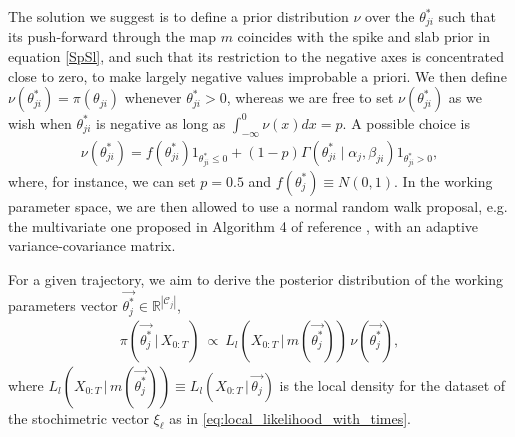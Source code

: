 \documentclass[pdflatex,sn-mathphys-num]{sn-jnl}%
\theoremstyle{thmstyleone}%
\theoremstyle{thmstyletwo}%
\theoremstyle{thmstylethree}%
\begin{document}
The solution we suggest is to define a prior distribution $\nu$ over the $
\theta_{ji}^ *$ such that its push-forward through the map $m$ coincides with the spike and slab prior in equation \eqref{SpSl}, and such that its restriction to the negative axes is concentrated close to zero, to make largely negative values improbable a priori.
We then define
$\nu(\theta_{ji}^ *)=\pi(\theta_{ji})$ whenever $\theta_{ji}^ *>0$,
whereas we are free to set $\nu(\theta_{ji}^ *)$ as we wish when $\theta_{ji}^ *$ is negative as long as $\int_{-\infty}^0 \nu (x) dx= p.$
A possible choice is
 \begin{align*}
    \nu(\theta_{ji}^*)=  f(\theta_{ji}^*)\mathrm{1}_{\theta_{ji}^*\leq 0} + (1-p) \Gamma(\theta_{ji}^* \mid \alpha_{j}, \beta_{ji})\mathrm{1}_{\theta_{ji}^*> 0} ,
\end{align*}
where, for instance, we can set $p=0.5$ and $f(\theta_{j}^*)\equiv N(0,1)$.
In the working parameter space, we are then allowed to use a normal random walk proposal, e.g. the multivariate one proposed in Algorithm 4 of reference \cite{Andrieu2008_adapt_algo}, with an adaptive variance-covariance matrix.




For a given trajectory, we aim to derive the posterior distribution of the working parameters vector 
$\overrightarrow{\theta_j^*}\in \mathbb{R}^{\left| \mathcal{C}_j \right|}$,
\begin{align*}
\pi\left(\overrightarrow{\theta_j^*} \, \Big|\,   X_{0:T} \right) ~\propto~  L_{l}\left(X_{0:T} \, \Big| \, m\left(\overrightarrow{\theta_j^*}\right)\right) \, \nu \left(\overrightarrow{\theta_j^*}  \right),
\end{align*}
where $L_{l}\left(X_{0:T} \, \Big| \, m\left(\overrightarrow{\theta_j^*}\right)\right) \equiv L_{l}\left(X_{0:T} \, \Big| \, \overrightarrow{\theta_j}\right)  $ is the local density for the dataset of the stochimetric vector $\xi_{\ell}$  as in \eqref{eq:local_likelihood_with_times}. 
\end{document}
